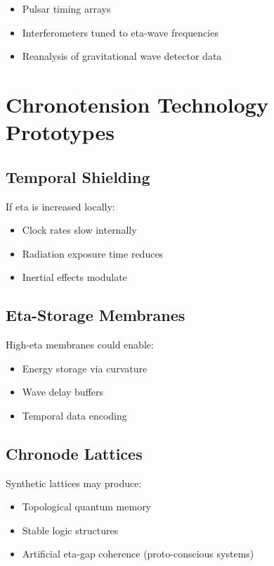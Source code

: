 \documentclass[12pt]{article}
\begin{document}
\begin{itemize}
\item Pulsar timing arrays
\item Interferometers tuned to eta-wave frequencies
\item Reanalysis of gravitational wave detector data
\end{itemize}

\section{Chronotension Technology Prototypes}

\subsection*{Temporal Shielding}

If eta is increased locally:

\begin{itemize}
\item Clock rates slow internally
\item Radiation exposure time reduces
\item Inertial effects modulate
\end{itemize}

\subsection*{Eta-Storage Membranes}

High-eta membranes could enable:

\begin{itemize}
\item Energy storage via curvature
\item Wave delay buffers
\item Temporal data encoding
\end{itemize}

\subsection*{Chronode Lattices}

Synthetic lattices may produce:

\begin{itemize}
\item Topological quantum memory
\item Stable logic structures
\item Artificial eta-gap coherence (proto-conscious systems)
\end{itemize}
\end{document}
